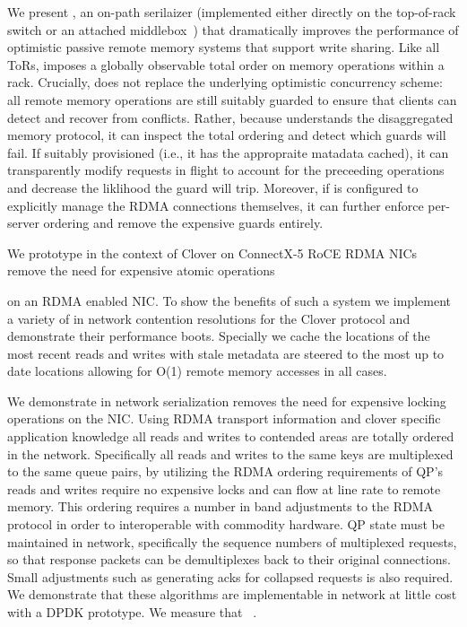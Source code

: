 We present {\sword}, an on-path serilaizer (implemented either
directly on the top-of-rack switch or an attached
middlebox~\cite{disandapp}) that dramatically improves the performance
of optimistic passive remote memory systems that support write
sharing.  Like all ToRs, {\sword} imposes a globally observable total
order on memory operations within a rack.  Crucially, {\sword} does
not replace the underlying optimistic concurrency scheme: all remote
memory operations are still suitably guarded to ensure that clients
can detect and recover from conflicts.  Rather, because {\sword}
understands the disaggregated memory protocol, it can inspect the
total ordering and detect which guards will fail.  If suitably
provisioned (i.e., it has the appropraite matadata cached), it can
transparently modify requests in flight to account for the preceeding
operations and decrease the liklihood the guard will trip.  Moreover,
if {\sword} is configured to explicitly manage the RDMA connections
themselves, it can further enforce per-server ordering and remove the
expensive guards entirely.

We prototype {\sword} in the context of Clover on ConnectX-5 RoCE RDMA
NICs remove the need for expensive atomic operations

on an RDMA enabled NIC. To show the benefits of such a system we
implement a variety of in network contention resolutions for the
Clover protocol and demonstrate their performance boots. Specially we
cache the locations of the most recent reads and writes with stale
metadata are steered to the most up to date locations allowing for
O(1) remote memory accesses in all cases.

We demonstrate in network serialization removes the need for expensive locking
operations on the NIC. Using RDMA transport information and clover specific
application knowledge all reads and writes to contended areas are totally
ordered in the network. Specifically all reads and writes to the same keys are
multiplexed to the same queue pairs, by utilizing the RDMA ordering requirements
of QP's reads and writes require no expensive locks and can flow at line rate to
remote memory. This ordering requires a number in band adjustments to the RDMA
protocol in order to interoperable with commodity hardware. QP state must be
maintained in network, specifically the sequence numbers of multiplexed
requests, so that response packets can be demultiplexes back to their original
connections. Small adjustments such as generating acks for collapsed requests is
also required. We demonstrate that these algorithms are implementable in network
at little cost with a DPDK prototype. We measure that ~.

